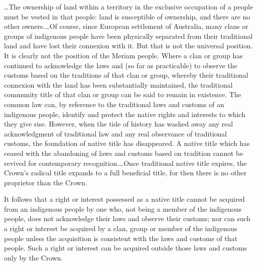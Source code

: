 \ldots The ownership of land within a territory in the exclusive occupation of a
people must be vested in that people: land is susceptible of ownership, and
there are no other owners.\ldots Of course, since European settlement of
Australia, many clans or groups of indigenous people have been physically
separated from their traditional land and have lost their connexion with it. But
that is not the universal position. It is clearly not the position of the Meriam
people. Where a clan or group has continued to acknowledge the laws and (so far
as practicable) to observe the customs based on the traditions of that clan or
group, whereby their traditional connexion with the land has been substantially
maintained, the traditional community title of that clan or group can be said to
remain in existence. The common law can, by reference to the traditional laws
and customs of an indigenous people, identify and protect the native rights and
interests to which they give rise. However, when the tide of history has washed
away any real acknowledgment of traditional law and any real observance of
traditional customs, the foundation of native title has disappeared. A native
title which has ceased with the abandoning of laws and customs based on
tradition cannot be revived for contemporary recognition.\ldots Once traditional
native title expires, the Crown's radical title expands to a full beneficial
title, for then there is no other proprietor than the Crown.

It follows that a right or interest possessed as a native title cannot be
acquired from an indigenous people by one who, not being a member of the
indigenous people, does not acknowledge their laws and observe their customs;
nor can such a right or interest be acquired by a clan, group or member of the
indigenous people unless the acquisition is consistent with the laws and customs
of that people. Such a right or interest can be acquired outside those laws and
customs only by the Crown.

